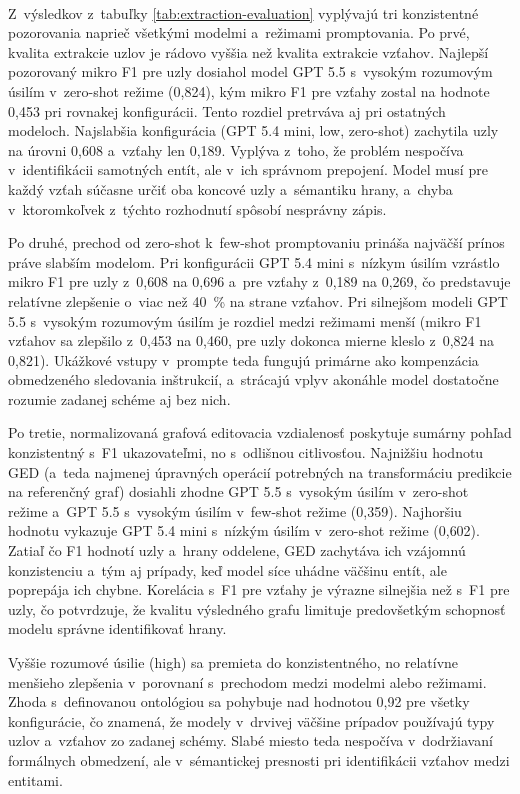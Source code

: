 \

Z~výsledkov z~tabuľky \ref{tab:extraction-evaluation} vyplývajú tri konzistentné pozorovania naprieč všetkými modelmi a~režimami promptovania. Po prvé, kvalita extrakcie uzlov je rádovo vyššia než kvalita extrakcie vzťahov. Najlepší pozorovaný mikro F1 pre uzly dosiahol model GPT 5.5 s~vysokým rozumovým úsilím v~zero-shot režime (0{,}824), kým mikro F1 pre vzťahy zostal na hodnote 0{,}453 pri rovnakej konfigurácii. Tento rozdiel pretrváva aj pri ostatných modeloch. Najslabšia konfigurácia (GPT 5.4 mini, low, zero-shot) zachytila uzly na úrovni 0{,}608 a~vzťahy len 0{,}189. Vyplýva z~toho, že problém nespočíva v~identifikácii samotných entít, ale v~ich správnom prepojení. Model musí pre každý vzťah súčasne určiť oba koncové uzly a~sémantiku hrany, a~chyba v~ktoromkoľvek z~týchto rozhodnutí spôsobí nesprávny zápis.

Po druhé, prechod od zero-shot k~few-shot promptovaniu prináša najväčší prínos práve slabším modelom. Pri konfigurácii GPT 5.4 mini s~nízkym úsilím vzrástlo mikro F1 pre uzly z~0{,}608 na 0{,}696 a~pre vzťahy z~0{,}189 na 0{,}269, čo predstavuje relatívne zlepšenie o~viac než 40~\% na strane vzťahov. Pri silnejšom modeli GPT 5.5 s~vysokým rozumovým úsilím je rozdiel medzi režimami menší (mikro F1 vzťahov sa zlepšilo z~0{,}453 na 0{,}460, pre uzly dokonca mierne kleslo z~0{,}824 na 0{,}821). Ukážkové vstupy v~prompte teda fungujú primárne ako kompenzácia obmedzeného sledovania inštrukcií, a~strácajú vplyv akonáhle model dostatočne rozumie zadanej schéme aj bez nich.

Po tretie, normalizovaná grafová editovacia vzdialenosť poskytuje sumárny pohľad konzistentný s~F1 ukazovateľmi, no s~odlišnou citlivosťou. Najnižšiu hodnotu GED (a~teda najmenej úpravných operácií potrebných na transformáciu predikcie na referenčný graf) dosiahli zhodne GPT 5.5 s~vysokým úsilím v~zero-shot režime a~GPT 5.5 s~vysokým úsilím v~few-shot režime (0{,}359). Najhoršiu hodnotu vykazuje GPT 5.4 mini s~nízkým úsilím v~zero-shot režime (0{,}602). Zatiaľ čo F1 hodnotí uzly a~hrany oddelene, GED zachytáva ich vzájomnú konzistenciu a~tým aj prípady, keď model síce uhádne väčšinu entít, ale poprepája ich chybne. Korelácia s~F1 pre vzťahy je výrazne silnejšia než s~F1 pre uzly, čo potvrdzuje, že kvalitu výsledného grafu limituje predovšetkým schopnosť modelu správne identifikovať hrany.

Vyššie rozumové úsilie (high) sa premieta do konzistentného, no relatívne menšieho zlepšenia v~porovnaní s~prechodom medzi modelmi alebo režimami. Zhoda s~definovanou ontológiou sa pohybuje nad hodnotou 0{,}92 pre všetky konfigurácie, čo znamená, že modely v~drvivej väčšine prípadov používajú typy uzlov a~vzťahov zo zadanej schémy. Slabé miesto teda nespočíva v~dodržiavaní formálnych obmedzení, ale v~sémantickej presnosti pri identifikácii vzťahov medzi entitami.

